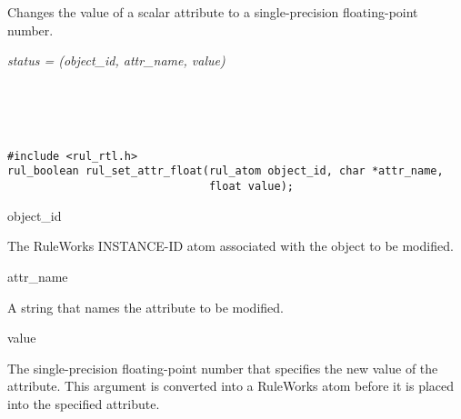 \begin{seealso}




\end{seealso}

\section*{}

Changes the value of a scalar attribute to a single-precision
floating-point number.

\Syntax

\it{status} = (\it{object\_id},
\it{attr\_name}, \it{value})

\begin{args}
   \\
   \\
   \\
\end{args}

\CBinding
\begin{verbatim}
#include <rul_rtl.h>
rul_boolean rul_set_attr_float(rul_atom object_id, char *attr_name,
                               float value);
\end{verbatim}

\begin{arguments}
\item[object\_id]

  The RuleWorks INSTANCE-ID atom associated with the object to be
  modified.

\item[attr\_name]

  A string that names the attribute to be modified.
   
\item[value]

  The single-precision floating-point number that specifies the new
  value of the attribute. This argument is converted into a RuleWorks
   atom before it is placed into the specified attribute.
\end{arguments}

\ReturnValue

